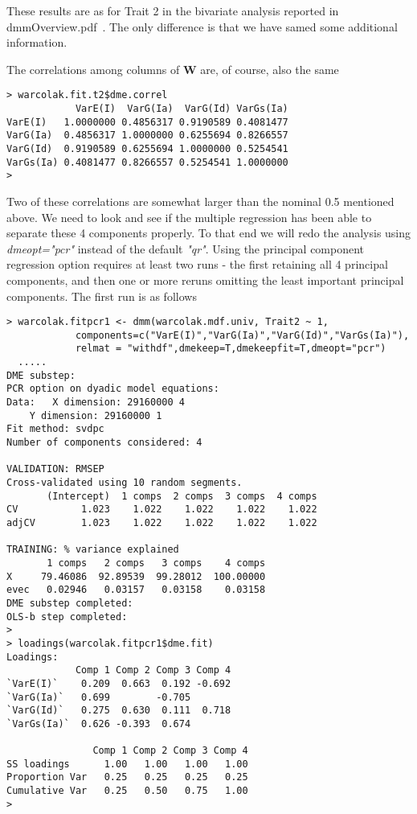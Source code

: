 \documentclass[titlepage]{article}  %
\begin{document}
These results are as for Trait 2 in the bivariate analysis reported in dmmOverview.pdf~\cite{jack:15}. The only difference is that we have samed some additional information. 

The correlations among columns of $\bm{W}$ are, of course, also the same

\begin{verbatim}
> warcolak.fit.t2$dme.correl
            VarE(I)  VarG(Ia)  VarG(Id) VarGs(Ia)
VarE(I)   1.0000000 0.4856317 0.9190589 0.4081477
VarG(Ia)  0.4856317 1.0000000 0.6255694 0.8266557
VarG(Id)  0.9190589 0.6255694 1.0000000 0.5254541
VarGs(Ia) 0.4081477 0.8266557 0.5254541 1.0000000
>
\end{verbatim}

Two of these correlations are somewhat larger than the nominal 0.5 mentioned above. We need to look and see if the multiple regression has been able to separate these 4 components properly. To that end we will redo the analysis using {\em dmeopt="pcr"} instead of the default {\em "qr"}. Using the principal component regression option requires at least two runs - the first retaining all 4 principal components, and then one or more reruns omitting the least important principal components. The first run is as follows

\begin{verbatim}
> warcolak.fitpcr1 <- dmm(warcolak.mdf.univ, Trait2 ~ 1,
            components=c("VarE(I)","VarG(Ia)","VarG(Id)","VarGs(Ia)"),
            relmat = "withdf",dmekeep=T,dmekeepfit=T,dmeopt="pcr")
  .....
DME substep:
PCR option on dyadic model equations:
Data: 	X dimension: 29160000 4 
	Y dimension: 29160000 1
Fit method: svdpc
Number of components considered: 4

VALIDATION: RMSEP
Cross-validated using 10 random segments.
       (Intercept)  1 comps  2 comps  3 comps  4 comps
CV           1.023    1.022    1.022    1.022    1.022
adjCV        1.023    1.022    1.022    1.022    1.022

TRAINING: % variance explained
       1 comps   2 comps   3 comps    4 comps
X     79.46086  92.89539  99.28012  100.00000
evec   0.02946   0.03157   0.03158    0.03158
DME substep completed:
OLS-b step completed:
> 
> loadings(warcolak.fitpcr1$dme.fit)
Loadings:
            Comp 1 Comp 2 Comp 3 Comp 4
`VarE(I)`    0.209  0.663  0.192 -0.692
`VarG(Ia)`   0.699        -0.705       
`VarG(Id)`   0.275  0.630  0.111  0.718
`VarGs(Ia)`  0.626 -0.393  0.674       

               Comp 1 Comp 2 Comp 3 Comp 4
SS loadings      1.00   1.00   1.00   1.00
Proportion Var   0.25   0.25   0.25   0.25
Cumulative Var   0.25   0.50   0.75   1.00
>
\end{verbatim}
\end{document}
